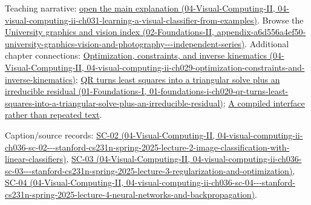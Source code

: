 Teaching narrative: \href{../04-Visual-Computing-II/main.pdf\#nameddest=04-visual-computing-ii-ch031-learning-a-visual-classifier-from-examples}{open the main explanation (04-Visual-Computing-II, 04-visual-computing-ii-ch031-learning-a-visual-classifier-from-examples)}. Browse the \href{../02-Foundations-II/main.pdf\#nameddest=appendix-a6d556a4ef50-university-graphics-vision-and-photography---independent-series}{University graphics and vision index (02-Foundations-II, appendix-a6d556a4ef50-university-graphics-vision-and-photography-\/-\/-independent-series)}. Additional chapter connections: \href{../04-Visual-Computing-II/main.pdf\#nameddest=04-visual-computing-ii-ch029-optimization-constraints-and-inverse-kinematics}{Optimization, constraints, and inverse kinematics (04-Visual-Computing-II, 04-visual-computing-ii-ch029-optimization-constraints-and-inverse-kinematics)}; \href{../01-Foundations-I/main.pdf\#nameddest=01-foundations-i-ch020-qr-turns-least-squares-into-a-triangular-solve-plus-an-irreducible-residual}{QR turns least squares into a triangular solve plus an irreducible residual (01-Foundations-I, 01-foundations-i-ch020-qr-turns-least-squares-into-a-triangular-solve-plus-an-irreducible-residual)}; \href{Continuous\%20Notes/Computing\%20Foundations\%20-\%20From\%20Bits\%20to\%20C++\%20and\%20Systems\%20APIs\#A\%20compiled\%20interface\%20rather\%20than\%20repeated\%20text}{A compiled interface rather than repeated text}.

Caption/source records: \href{../04-Visual-Computing-II/main.pdf\#nameddest=04-visual-computing-ii-ch036-sc-02---stanford-cs231n-spring-2025-lecture-2-image-classification-with-linear-classifiers}{SC-02 (04-Visual-Computing-II, 04-visual-computing-ii-ch036-sc-02-\/-\/-stanford-cs231n-spring-2025-lecture-2-image-classification-with-linear-classifiers)}, \href{../04-Visual-Computing-II/main.pdf\#nameddest=04-visual-computing-ii-ch036-sc-03---stanford-cs231n-spring-2025-lecture-3-regularization-and-optimization}{SC-03 (04-Visual-Computing-II, 04-visual-computing-ii-ch036-sc-03-\/-\/-stanford-cs231n-spring-2025-lecture-3-regularization-and-optimization)}, \href{../04-Visual-Computing-II/main.pdf\#nameddest=04-visual-computing-ii-ch036-sc-04---stanford-cs231n-spring-2025-lecture-4-neural-networks-and-backpropagation}{SC-04 (04-Visual-Computing-II, 04-visual-computing-ii-ch036-sc-04-\/-\/-stanford-cs231n-spring-2025-lecture-4-neural-networks-and-backpropagation)}.
